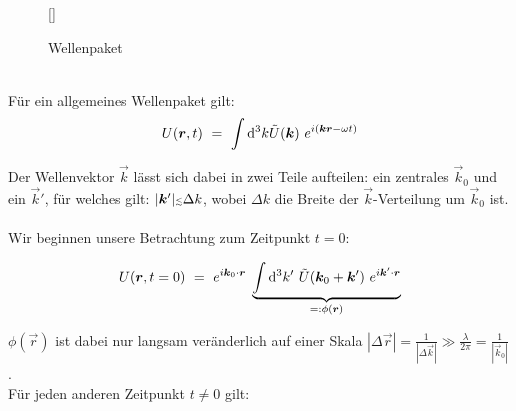 \begin{wrapfigure}[12]{r}[0cm]{0cm}
	\raisebox{-1cm}[\dimexpr{}\baselineskip\relax]{
		\colorbox{hgrey}{
		}
	}
	\caption{Wellenpaket}
\end{wrapfigure}
\ \\
Für ein allgemeines Wellenpaket gilt:
\begin{equation*}
U(\bm{r},t)  \ = \ \int\mathrm{d}^3 k  \tilde{U}(\bm{k}) \ e^{i(\bm{k}\bm{r}-\omega t)}
\end{equation*}

Der Wellenvektor $\vec{k}$ lässt sich dabei in zwei Teile aufteilen: ein zentrales $\vec{k}_0$ und ein $\vec{k}'$, für welches gilt: $|\vec{k}'| \mathsmaller{\mathsmaller{\lesssim}} \Delta k$, wobei $\Delta k$ die Breite der $\vec{k}$-Verteilung um $\vec{k}_0$ ist.\\
\ \\
Wir beginnen unsere Betrachtung zum Zeitpunkt $t=0$:

\begin{equation*}
U(\bm{r},t=0) \ = \ e^{i\bm{k}_0 \cdot\bm{r}} \; \underbrace{\int\mathrm{d}^3 k' \ \tilde{U}(\bm{k}_0 + \bm{k}') \ e^{i\bm{k}'\cdot\bm{r}}}_{=: \phi(\bm{r})}
\end{equation*}

$\phi(\vec{r})$ ist dabei nur langsam veränderlich auf einer Skala $|\Delta \vec{r}| = \frac{1}{|\Delta \vec{k}|} \gg \frac{\lambda}{2\pi}= \frac{1}{|\vec{k}_0|}$.\\ 
Für jeden anderen Zeitpunkt $t \neq 0$ gilt:

